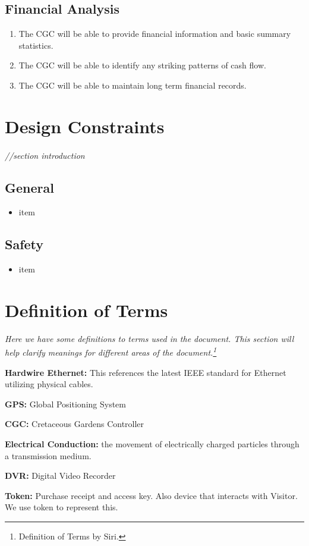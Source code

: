\documentclass[12pt]{article}
\begin{document}
	\subsection{Financial Analysis}
	\begin{enumerate}
		\item The CGC will be able to provide financial information and basic summary statistics.
		\item The CGC will be able to identify any striking patterns of cash flow.
		\item The CGC will be able to maintain long term financial records.
	\end{enumerate}

\section{Design Constraints} %
\label{con}
\paragraph{} \textit{//section introduction}
	\subsection{General}
	\begin{itemize}
		\item item
	\end{itemize}
	
	\subsection{Safety}
	\begin{itemize}
		\item item
	\end{itemize}

\section{Definition of Terms} %
\label{def}
\textit{Here we have some definitions to terms used in the document. This section will help clarify meanings for different areas of the document.\footnote {Definition of Terms by Siri.}}
\begin{list}{}{}
	\item \textbf{Hardwire Ethernet: }This references the latest IEEE standard for Ethernet utilizing physical cables.
	\item \textbf{GPS: }Global Positioning System 
	\item \textbf{CGC: }Cretaceous Gardens Controller 
	\item \textbf{Electrical Conduction: }the movement of electrically charged particles through a transmission medium.
	\item \textbf{DVR: }Digital Video Recorder
	\item \textbf{Token: }Purchase receipt and access key. Also device that interacts with Visitor. We use token to represent this.
\end{list}

\end{document}
